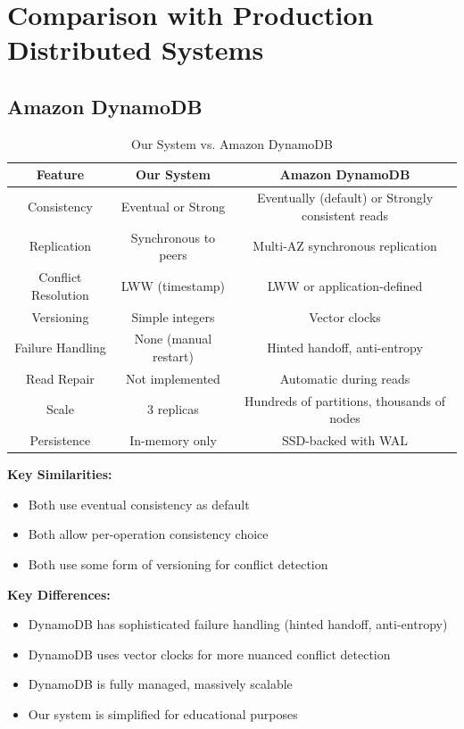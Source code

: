\documentclass[10pt,a4paper]{article}
\begin{document}
\section{Comparison with Production Distributed Systems}

\subsection{Amazon DynamoDB}

\begin{table}[H]
\centering
\caption{Our System vs. Amazon DynamoDB}
\begin{tabular}{|c|c|c|}
\hline
\textbf{Feature} & \textbf{Our System} & \textbf{Amazon DynamoDB} \\
\hline
Consistency & Eventual or Strong & Eventually (default) or Strongly consistent reads \\
\hline
Replication & Synchronous to peers & Multi-AZ synchronous replication \\
\hline
Conflict Resolution & LWW (timestamp) & LWW or application-defined \\
\hline
Versioning & Simple integers & Vector clocks \\
\hline
Failure Handling & None (manual restart) & Hinted handoff, anti-entropy \\
\hline
Read Repair & Not implemented & Automatic during reads \\
\hline
Scale & 3 replicas & Hundreds of partitions, thousands of nodes \\
\hline
Persistence & In-memory only & SSD-backed with WAL \\
\hline
\end{tabular}
\end{table}

\textbf{Key Similarities:}
\begin{itemize}
    \item Both use eventual consistency as default
    \item Both allow per-operation consistency choice
    \item Both use some form of versioning for conflict detection
\end{itemize}

\textbf{Key Differences:}
\begin{itemize}
    \item DynamoDB has sophisticated failure handling (hinted handoff, anti-entropy)
    \item DynamoDB uses vector clocks for more nuanced conflict detection
    \item DynamoDB is fully managed, massively scalable
    \item Our system is simplified for educational purposes
\end{itemize}
\end{document}

